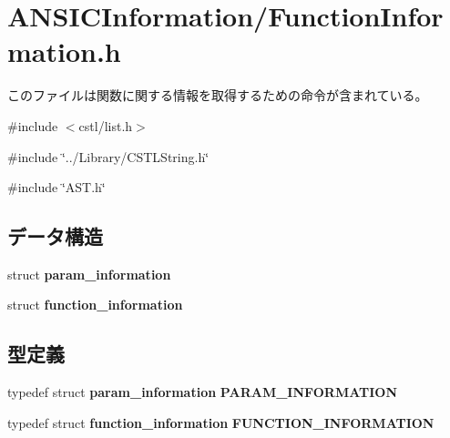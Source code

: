\section{ANSICInformation/FunctionInformation.h}
\label{FunctionInformation_8h}


このファイルは関数に関する情報を取得するための命令が含まれている。  


{\ttfamily \#include $<$cstl/list.h$>$}\par
{\ttfamily \#include \char`\"{}../Library/CSTLString.h\char`\"{}}\par
{\ttfamily \#include \char`\"{}AST.h\char`\"{}}\par
\subsection*{データ構造}
\begin{DoxyCompactItemize}
\item 
struct {\bf param\_\-information}
\item 
struct {\bf function\_\-information}
\end{DoxyCompactItemize}
\subsection*{型定義}
\begin{DoxyCompactItemize}
\item 
typedef struct {\bf param\_\-information} {\bf PARAM\_\-INFORMATION}
\item 
typedef struct {\bf function\_\-information} {\bf FUNCTION\_\-INFORMATION}
\end{DoxyCompactItemize}
